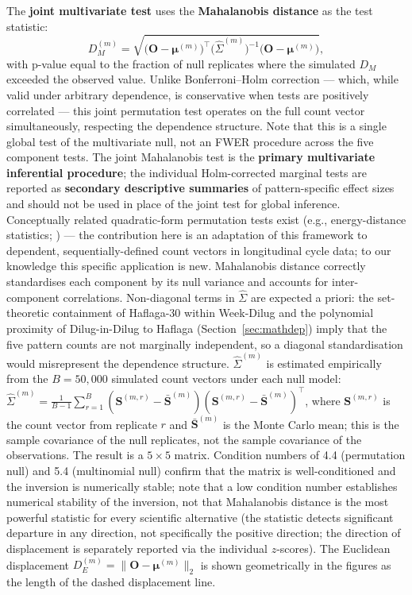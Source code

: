 \documentclass[12pt]{article}
\begin{document}
The \textbf{joint multivariate test} uses the \textbf{Mahalanobis distance} as the test statistic:
\begin{equation}
  D_M^{(m)} = \sqrt{\bigl(\mathbf{O}-\boldsymbol{\mu}^{(m)}\bigr)^\top
               \bigl(\hat{\Sigma}^{(m)}\bigr)^{-1}
               \bigl(\mathbf{O}-\boldsymbol{\mu}^{(m)}\bigr)},
  \label{eq:mahalanobis}
\end{equation}
with p-value equal to the fraction of null replicates where the simulated $D_M$ exceeded
the observed value. Unlike Bonferroni--Holm correction --- which, while valid under arbitrary
dependence, is conservative when tests are positively correlated --- this joint permutation test operates on the full count vector simultaneously,
respecting the dependence structure. Note that this is a single global test of
the multivariate null, not an FWER procedure across the five component tests.
The joint Mahalanobis test is the \textbf{primary multivariate inferential procedure};
the individual Holm-corrected marginal tests are reported as \textbf{secondary descriptive summaries}
of pattern-specific effect sizes and should not be used in place of the joint test
for global inference. Conceptually related quadratic-form permutation tests exist
(e.g., energy-distance statistics; \citealp{king2018}) --- the contribution here is
an adaptation of this framework to dependent, sequentially-defined count vectors
in longitudinal cycle data; to our knowledge this specific application is new. Mahalanobis distance correctly standardises each component by its null variance and accounts for inter-component correlations. Non-diagonal terms in $\hat{\Sigma}$ are expected a priori: the set-theoretic containment of Haflaga-30 within Week-Dilug and the polynomial proximity of Dilug-in-Dilug to Haflaga (Section~\ref{sec:mathdep}) imply that the five pattern counts are not marginally independent, so a diagonal standardisation would misrepresent the dependence structure. $\hat{\Sigma}^{(m)}$ is estimated empirically from the $B = 50{,}000$ simulated count vectors under each null model: $\hat{\Sigma}^{(m)} = \frac{1}{B-1}\sum_{r=1}^{B}(\mathbf{S}^{(m,r)} - \bar{\mathbf{S}}^{(m)})(\mathbf{S}^{(m,r)} - \bar{\mathbf{S}}^{(m)})^\top$, where $\mathbf{S}^{(m,r)}$ is the count vector from replicate $r$ and $\bar{\mathbf{S}}^{(m)}$ is the Monte Carlo mean; this is the sample covariance of the null replicates, not the sample covariance of the observations. The result is a $5 \times 5$ matrix. Condition numbers of 4.4 (permutation null) and 5.4 (multinomial null) confirm that the matrix is well-conditioned and the inversion is numerically stable; note that a low condition number establishes numerical stability of the inversion, not that Mahalanobis distance is the most powerful statistic for every scientific alternative (the statistic detects significant departure in any direction, not specifically the positive direction; the direction of displacement is separately reported via the individual $z$-scores). The Euclidean displacement $D_E^{(m)} = \|\mathbf{O} - \boldsymbol{\mu}^{(m)}\|_2$ is shown geometrically in the figures as the length of the dashed displacement line.
\end{document}
